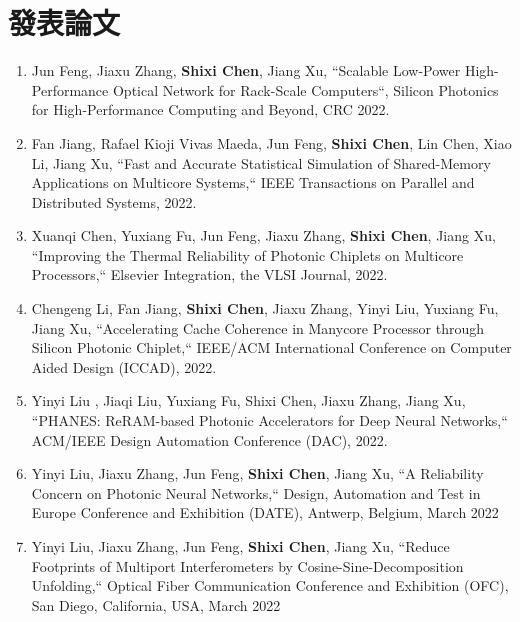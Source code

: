 \documentclass{mycv}
\begin{document}
\section{發表論文}%



\begin{enumerate}
	\item Jun Feng, Jiaxu Zhang, \textbf{Shixi Chen}, Jiang Xu, ``Scalable Low-Power High-Performance Optical Network for Rack-Scale Computers``, Silicon Photonics for High-Performance Computing and Beyond, CRC 2022.
	\item Fan Jiang, Rafael Kioji Vivas Maeda, Jun Feng, \textbf{Shixi Chen}, Lin Chen, Xiao Li, Jiang Xu, ``Fast and Accurate Statistical Simulation of Shared-Memory Applications on Multicore Systems,`` IEEE Transactions on Parallel and Distributed Systems, 2022.
	\item Xuanqi Chen, Yuxiang Fu, Jun Feng, Jiaxu Zhang, \textbf{Shixi Chen}, Jiang Xu, ``Improving the Thermal Reliability of Photonic Chiplets on Multicore Processors,`` Elsevier Integration, the VLSI Journal, 2022.
	\item Chengeng Li, Fan Jiang, \textbf{Shixi Chen}, Jiaxu Zhang, Yinyi Liu, Yuxiang Fu, Jiang Xu, ``Accelerating Cache Coherence in Manycore Processor through Silicon Photonic Chiplet,`` IEEE/ACM International Conference on Computer Aided Design (ICCAD), 2022.
	\item Yinyi Liu \textsuperscript{\textdagger}, Jiaqi Liu\textsuperscript{\textdagger}, Yuxiang Fu, Shixi Chen, Jiaxu Zhang, Jiang Xu, ``PHANES: ReRAM-based Photonic Accelerators for Deep Neural Networks,`` ACM/IEEE Design Automation Conference (DAC), 2022.
	\item Yinyi Liu, Jiaxu Zhang, Jun Feng, \textbf{Shixi Chen}, Jiang Xu, ``A Reliability Concern on Photonic Neural Networks,`` Design, Automation and Test in Europe Conference and Exhibition (DATE), Antwerp, Belgium, March 2022
	\item Yinyi Liu, Jiaxu Zhang, Jun Feng, \textbf{Shixi Chen}, Jiang Xu, ``Reduce Footprints of Multiport Interferometers by Cosine-Sine-Decomposition Unfolding,`` Optical Fiber Communication Conference and Exhibition (OFC), San Diego, California, USA, March 2022

\end{enumerate}
\end{document}
